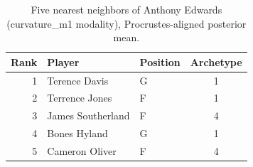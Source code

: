 \begin{table}[htbp]
  \centering\small
  \begin{tabular}{rllc}
    \toprule
    Rank & Player & Position & Archetype \\
    \midrule
    1 & Terence Davis & G & 1 \\
    2 & Terrence Jones & F & 1 \\
    3 & James Southerland & F & 4 \\
    4 & Bones Hyland & G & 1 \\
    5 & Cameron Oliver & F & 4 \\
    \bottomrule
  \end{tabular}
  \caption{Five nearest neighbors of Anthony Edwards (curvature_m1 modality), Procrustes-aligned posterior mean.}
  \label{tab:Anthony_Edwards_neighbors_curvature_m1}
\end{table}


